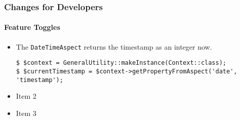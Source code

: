 %

\begin{frame}[fragile]
	\frametitle{Changes for Developers}
	\framesubtitle{Feature Toggles}

	\begin{itemize}
		\item The \texttt{DateTimeAspect} returns the timestamp as an integer now.
		\begin{lstlisting}
$ $context = GeneralUtility::makeInstance(Context::class);
$ $currentTimestamp = $context->getPropertyFromAspect('date', 'timestamp');
		\end{lstlisting}

		\item Item 2
		\item Item 3
	\end{itemize}

\end{frame}

